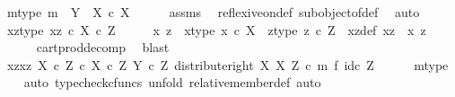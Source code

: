 \begin{isabellebody}
\ m{\isacharunderscore}{\kern0pt}type{\isacharcolon}{\kern0pt}\ {\isachardoublequoteopen}m\ {\isacharcolon}{\kern0pt}\ Y\ {\isasymrightarrow}\ X\ {\isasymtimes}\isactrlsub c\ X{\isachardoublequoteclose}\isanewline
\ \ \ \ \isamarkupfalse%
\ assms\ \isamarkupfalse%
\ reflexive{\isacharunderscore}{\kern0pt}on{\isacharunderscore}{\kern0pt}def\ subobject{\isacharunderscore}{\kern0pt}of{\isacharunderscore}{\kern0pt}def{}\ \isamarkupfalse%
\ auto\isanewline
\ \ \isamarkupfalse%
\ xz{\isacharunderscore}{\kern0pt}type{\isacharcolon}{\kern0pt}\ {\isachardoublequoteopen}xz\ {\isasymin}\isactrlsub c\ X\ {\isasymtimes}\isactrlsub c\ Z{\isachardoublequoteclose}\isanewline
\ \ \isamarkupfalse%
\ \isamarkupfalse%
\ x\ z\ \ x{\isacharunderscore}{\kern0pt}type{\isacharcolon}{\kern0pt}\ {\isachardoublequoteopen}x\ {\isasymin}\isactrlsub c\ X{\isachardoublequoteclose}\ \ z{\isacharunderscore}{\kern0pt}type{\isacharcolon}{\kern0pt}\ {\isachardoublequoteopen}z\ {\isasymin}\isactrlsub c\ Z{\isachardoublequoteclose}\ \ xz{\isacharunderscore}{\kern0pt}def{\isacharcolon}{\kern0pt}\ {\isachardoublequoteopen}xz\ {\isacharequal}{\kern0pt}\ {\isasymlangle}x{\isacharcomma}{\kern0pt}\ z{\isasymrangle}{\isachardoublequoteclose}\isanewline
\ \ \ \ \isamarkupfalse%
\ cart{\isacharunderscore}{\kern0pt}prod{\isacharunderscore}{\kern0pt}decomp\ \isamarkupfalse%
\ blast\isanewline
\ \ \isamarkupfalse%
\ \isamarkupfalse%
\ {\isachardoublequoteopen}{\isasymlangle}xz{\isacharcomma}{\kern0pt}xz{\isasymrangle}\ {\isasymin}\isactrlbsub {\isacharparenleft}{\kern0pt}X\ {\isasymtimes}\isactrlsub c\ Z{\isacharparenright}{\kern0pt}\ {\isasymtimes}\isactrlsub c\ X\ {\isasymtimes}\isactrlsub c\ Z\isactrlesub \ {\isacharparenleft}{\kern0pt}Y\ {\isasymtimes}\isactrlsub c\ Z{\isacharcomma}{\kern0pt}\ distribute{\isacharunderscore}{\kern0pt}right\ X\ X\ Z\ {\isasymcirc}\isactrlsub c\ m\ {\isasymtimes}\isactrlsub f\ id\isactrlsub c\ Z{\isacharparenright}{\kern0pt}{\isachardoublequoteclose}\isanewline
\ \ \ \ \isamarkupfalse%
\ m{\isacharunderscore}{\kern0pt}type\isanewline
\ \ \isamarkupfalse%
\ {\isacharparenleft}{\kern0pt}auto{\isacharcomma}{\kern0pt}\ typecheck{\isacharunderscore}{\kern0pt}cfuncs{\isacharcomma}{\kern0pt}\ unfold\ relative{\isacharunderscore}{\kern0pt}member{\isacharunderscore}{\kern0pt}def{}{\isacharcomma}{\kern0pt}\ auto{\isacharparenright}{\kern0pt}\isanewline

\end{isabellebody}
